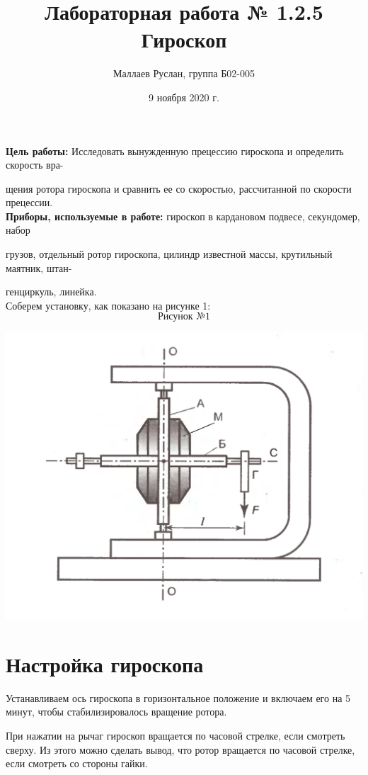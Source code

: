 \documentclass[a4paper, 12pt]{article}
\author{Маллаев Руслан, группа Б02-005}
\title{Лабораторная работа № 1.2.5 \\ Гироскоп
}
\date{9 ноября 2020 г.}
\begin{document}
\maketitle
\thispagestyle{empty}
\newpage
\textbf{Цель работы:} Исследовать вынужденную прецессию гироскопа и определить скорость вра-

щения ротора гироскопа и сравнить ее со скоростью, рассчитанной по скорости прецессии.\\

\textbf{Приборы, используемые в работе:} гироскоп в кардановом подвесе, секундомер, набор

грузов, отдельный ротор гироскопа, цилиндр известной массы, крутильный маятник, штан-

генциркуль, линейка.\\

Соберем установку, как показано на рисунке 1:
\[\text{Рисунок №1}\]
\begin{center}
\includegraphics[scale=0.6]{giro}
\end{center}

\newpage
\section{Настройка гироскопа}

Устанавливаем ось гироскопа в горизонтальное положение и включаем его на 5 минут, чтобы стабилизировалось вращение ротора.

При нажатии на рычаг гироскоп вращается по часовой стрелке, если смотреть сверху. Из этого можно сделать вывод, что ротор вращается по часовой стрелке, если смотреть со стороны гайки.
\end{document}

